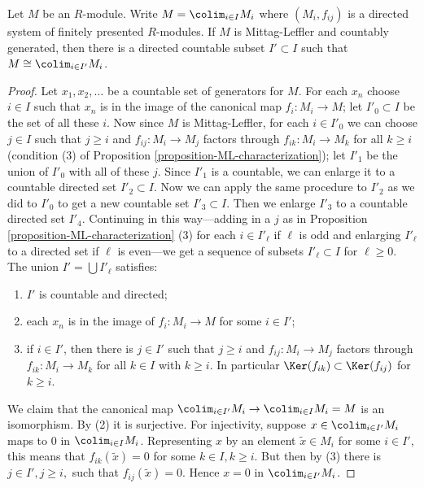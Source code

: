 \begin{lemma}
\label{lemma-ML-countable-colimit}
Let $M$ be an $R$-module.  Write $M = \colim_{i \in I} M_i$ where $(M_i,
f_{ij})$ is a directed system of finitely presented $R$-modules.  If $M$ is
Mittag-Leffler and countably generated, then there is a directed countable
subset $I' \subset I$ such that $M \cong \colim_{i \in I'} M_i$.
\end{lemma}

\begin{proof}
Let $x_1, x_2, \ldots$ be a countable set of generators for $M$.  For each $x_n$
choose $i \in I$ such that $x_n$ is in the image of the canonical map $f_i:
M_i \to M$; let $I'_{0} \subset I$ be the set of all these $i$.  Now
since $M$ is Mittag-Leffler, for each $i \in I'_{0}$ we can choose $j \in I$
such that $j \geq i$ and $f_{ij}: M_i \to M_j$ factors through
$f_{ik}: M_i \to M_k$ for all $k \geq i$  (condition (3) of Proposition
\ref{proposition-ML-characterization}); let $I'_1$ be the union of $I'_0$ with
all of these $j$.  Since $I'_1$ is a countable, we can enlarge it to a
countable directed set $I'_{2} \subset I$.  Now we can apply the same procedure
to $I'_{2}$ as we did to $I'_{0}$ to get a new countable set $I'_{3} \subset
I$.  Then we enlarge $I'_{3}$ to a countable directed set $I'_{4}$.  Continuing
in this way---adding in a $j$ as in Proposition
\ref{proposition-ML-characterization} (3) for each $ i \in I'_{\ell}$ if $\ell$
is odd and enlarging $I'_{\ell}$ to a directed set if $\ell$ is even---we get a
sequence of subsets $I'_{\ell} \subset I$ for $\ell \geq 0$.  The union $I' =
\bigcup I'_{\ell}$ satisfies:
\begin{enumerate}
\item $I'$ is countable and directed;
\item each $x_n$ is in the image of $f_i: M_i \to M$ for some $i
\in I'$;
\item if $i \in I'$, then there is $j \in I'$ such that $j \geq i$ and $f_{ij}:
M_i \to M_j$ factors through $f_{ik}: M_i \to M_k$ for all
$k \in I$ with $k \geq i$.  In particular $\Ker(f_{ik}) \subset \Ker(f_{ij})$
for $k \geq i$.
\end{enumerate}
We claim that the canonical map $\colim_{i \in I'} M_i \to
\colim_{i
\in I} M_i = M$ is an isomorphism.  By (2) it is surjective.  For injectivity,
suppose $x \in \colim_{i \in I'} M_i$ maps to $0$ in $\colim_{i \in
I} M_i$.
Representing $x$ by an element $\tilde{x} \in M_i$ for some $i \in I'$, this
means that $f_{ik}(\tilde{x}) = 0$ for some $k \in I, k \geq i$.  But then by
(3) there is $j \in I', j \geq i,$ such that $f_{ij}(\tilde{x}) = 0$.  Hence $x
= 0$ in $\colim_{i \in I'} M_i$.
\end{proof}
